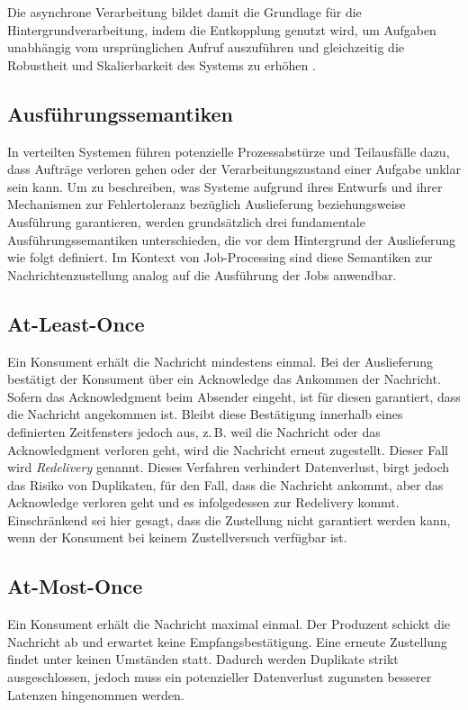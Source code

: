 Die asynchrone Verarbeitung bildet damit die Grundlage für die Hintergrundverarbeitung, indem die Entkopplung genutzt wird, um
Aufgaben unabhängig vom ursprünglichen Aufruf auszuführen und gleichzeitig die Robustheit und Skalierbarkeit des Systems
zu erhöhen \parencite[Kap.~8 Abschnitt \glqq Why Use A Message Broker?\grqq]{newman_building_2026}.

\subsection{Ausführungssemantiken}
\label{subsec:semantiken}
In verteilten Systemen führen potenzielle Prozessabstürze und Teilausfälle dazu, dass Aufträge verloren gehen oder der
Verarbeitungszustand einer Aufgabe unklar sein kann.
Um zu beschreiben, was Systeme aufgrund ihres Entwurfs und ihrer Mechanismen zur Fehlertoleranz bezüglich Auslieferung beziehungsweise
Ausführung garantieren, werden grundsätzlich drei fundamentale Ausführungssemantiken unterschieden, die
\textcite[Kap.~8 Abschnitt \glqq Types of Delivery Guarantees\grqq]{newman_building_2026} vor dem Hintergrund der Auslieferung wie folgt definiert.
Im Kontext von Job-Processing sind diese Semantiken zur Nachrichtenzustellung analog auf die Ausführung der Jobs anwendbar.

\subsection*{At-Least-Once}
\label{subsec:atLeastOnce}
Ein Konsument erhält die Nachricht mindestens einmal.
Bei der Auslieferung bestätigt der Konsument über ein Acknowledge das Ankommen der Nachricht.
Sofern das Acknowledgment beim Absender eingeht, ist für diesen garantiert, dass die Nachricht angekommen ist.
Bleibt diese Bestätigung innerhalb eines definierten Zeitfensters jedoch aus, z.\,B. weil die Nachricht oder das Acknowledgment
verloren geht, wird die Nachricht erneut zugestellt.
Dieser Fall wird \textit{Redelivery} genannt.
Dieses Verfahren verhindert Datenverlust, birgt jedoch das Risiko von Duplikaten, für den Fall, dass die Nachricht ankommt, aber das
Acknowledge verloren geht und es infolgedessen zur Redelivery kommt.
Einschränkend sei hier gesagt, dass die Zustellung nicht garantiert werden kann, wenn der Konsument bei keinem Zustellversuch verfügbar ist.

\subsection*{At-Most-Once}
\label{subsec:atMostOnce}
Ein Konsument erhält die Nachricht maximal einmal.
Der Produzent schickt die Nachricht ab und erwartet keine Empfangsbestätigung.
Eine erneute Zustellung findet unter keinen Umständen statt.
Dadurch werden Duplikate strikt ausgeschlossen, jedoch muss ein potenzieller Datenverlust zugunsten besserer Latenzen hingenommen werden.

